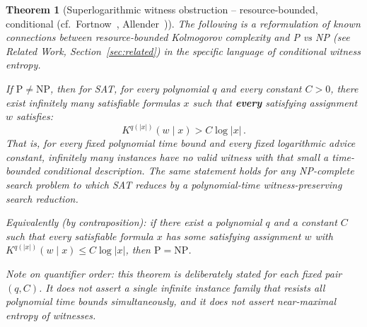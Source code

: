 \documentclass[aps,prd,twocolumn,superscriptaddress,nofootinbib]{revtex4-2}
\newtheorem{theorem}{Theorem}[section]
\theoremstyle{definition}
\theoremstyle{remark}
\newcommand{\NP}{\mathrm{NP}}
\newcommand{\PP}{\mathrm{P}}
\begin{document}
\begin{theorem}[Superlogarithmic witness obstruction -- resource-bounded, conditional {\normalfont (cf.\ Fortnow~\cite{Fortnow2000}, Allender~\cite{Allender2001})}]
\label{thm:high_entropy}
The following is a reformulation of known connections between resource-bounded Kolmogorov complexity and P vs NP (see Related Work, Section~\ref{sec:related}) in the specific language of conditional witness entropy.

If $\PP \neq \NP$, then for SAT, for every polynomial $q$ and every constant $C>0$, there exist infinitely many satisfiable formulas $x$ such that \textbf{every} satisfying assignment $w$ satisfies:
\begin{equation}
K^{q(|x|)}(w \mid x) > C \log |x|\,.
\label{eq:high_entropy}
\end{equation}
That is, for every fixed polynomial time bound and every fixed logarithmic advice constant, infinitely many instances have no valid witness with that small a time-bounded conditional description. The same statement holds for any NP-complete search problem to which SAT reduces by a polynomial-time witness-preserving search reduction.

Equivalently (by contraposition): if there exist a polynomial $q$ and a constant $C$ such that every satisfiable formula $x$ has some satisfying assignment $w$ with $K^{q(|x|)}(w \mid x) \leq C\log |x|$, then $\PP = \NP$.

Note on quantifier order: this theorem is deliberately stated for each fixed pair $(q,C)$. It does \emph{not} assert a single infinite instance family that resists all polynomial time bounds simultaneously, and it does \emph{not} assert near-maximal entropy of witnesses.
\end{theorem}
\end{document}

